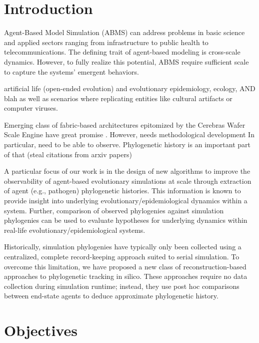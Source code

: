 \section{Introduction} \label{sec:introduction}

Agent-Based Model Simulation (ABMS) can address problems in basic science and applied sectors ranging from infrastructure to public health to
telecommunications.
The defining trait of agent-based modeling is cross-scale dynamics.
However, to fully realize this potential, ABMS require sufficient scale to capture the systems' emergent behaviors.

artificial life (open-ended evolution) and evolutionary epidemiology, ecology, AND blah as well as scenarios where replicating entities like cultural artifacts or computer viruses.

Emerging class of fabric-based architectures epitomized by the Cerebras Wafer Scale Engine have great promise \citep{lauterbach2021path,lie2022cerebras}.
However, needs methodological development
In particular, need to be able to observe.
Phylogenetic history is an important part of that (steal citations from arxiv papers)



A particular focus of our work is in the design of new algorithms to improve the observability of agent-based evolutionary simulations at scale through extraction of agent (e.g., pathogen) phylogenetic histories.
This information is known to provide insight into underlying evolutionary/epidemiological dynamics within a system.
Further, comparison of observed phylogenies against simulation phylogenies can be used to evaluate hypotheses for underlying dynamics within real-life evolutionary/epidemiological systems.

Historically, simulation phylogenies have typically only been collected using a centralized, complete record-keeping approach suited to serial simulation.
To overcome this limitation, we have proposed a new class of reconstruction-based approaches to phylogenetic tracking in silico.
These approaches require no data collection during simulation runtime; instead, they use post hoc comparisons between end-state agents to deduce approximate phylogenetic history.

\section{Objectives} \label{sec:objectives}

